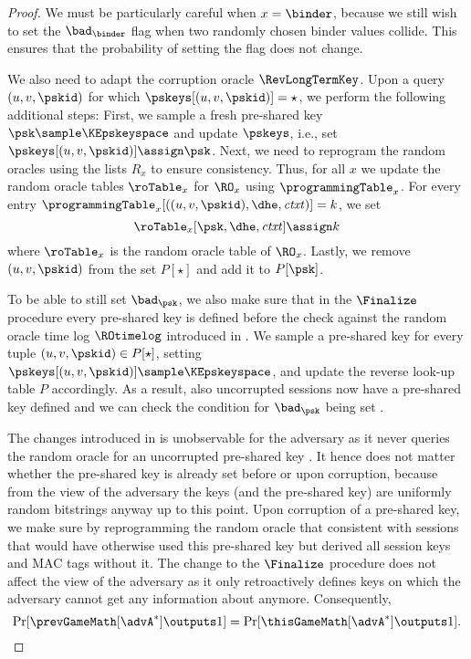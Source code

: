 \begin{proof}
	We must be particularly careful when $x = \binder$, because we still wish to set the $\bad_{\binder}$ flag when two randomly chosen binder values collide.
	This ensures that the probability of setting the flag does not change.

	We also need to adapt the corruption oracle $\RevLongTermKey$.
	Upon a query $(u,v,\pskid)$ for which $\pskeys[ (u,v,\pskid) ] = \star$, we perform the following additional steps:
	First, we sample a fresh pre-shared key~$\psk \sample \KEpskeyspace$ and update $\pskeys$, i.e., set $\pskeys[ (u,v,\pskid) ] \assign \psk$.
	Next, we need to reprogram the random oracles using the lists $R_x$ to ensure consistency.
	Thus, for all $x$ we update the random oracle tables $\roTable_x$ for $\RO_x$ using $\programmingTable_x$.
	For every entry $\programmingTable_x[((u,v, \pskid) , \dhe , \mathit{ctxt})] = k$, we set 
	\[
		\roTable_x[ \psk, \dhe , \mathit{ctxt}  ] \assign k
	\]
	where $\roTable_x$ is the random oracle table of $\RO_x$.
	Lastly, we remove $(u,v,\pskid)$ from the set $P[\star]$ and add it to $P[\psk]$.
	
	To be able to still set $\bad_\psk$, we also make sure that in the $\Finalize$ procedure every pre-shared key is defined before the check against the random oracle time log $\ROtimelog$ introduced in .
	We sample a pre-shared key for every tuple $(u,v,\pskid) \in P[\star]$, setting $\pskeys[ (u,v,\pskid) ] \sample \KEpskeyspace$, and update the reverse look-up table $P$ accordingly.
	As a result, also uncorrupted sessions now have a pre-shared key defined and we can check the condition for $\bad_\psk$ being set .
		
	The changes introduced in \thisGame is unobservable for the adversary as it never queries the random oracle for an uncorrupted pre-shared key .
	It hence does not matter whether the pre-shared key is already set before or upon corruption, because from the view of the adversary the keys (and the pre-shared key) are uniformly random bitstrings anyway up to this point.
	Upon corruption of a pre-shared key, we make sure by reprogramming the random oracle that  consistent with sessions that would have otherwise used this pre-shared key but derived all session keys and MAC tags without it.
	The change to the $\Finalize$ procedure does not affect the view of the adversary as it only retroactively defines keys on which the adversary cannot get any information about anymore.
	Consequently,
	\[
	\Pr[ \prevGameMath[\advA^*] \outputs 1 ] = \Pr[ \thisGameMath[\advA^*] \outputs 1 ].
	\]
	

\end{proof}
